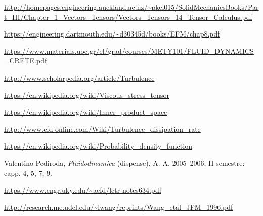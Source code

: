 \documentclass[12pt,a4paper]{article}
\numberwithin{equation}{subsection}
\begin{document}
\begin{thebibliography}{1}
  \url{http://homepages.engineering.auckland.ac.nz/~pkel015/SolidMechanicsBooks/Part_III/Chapter_1_Vectors_Tensors/Vectors_Tensors_14_Tensor_Calculus.pdf}

  \url{https://engineering.dartmouth.edu/~d30345d/books/EFM/chap8.pdf}

  \url{https://www.materials.uoc.gr/el/grad/courses/METY101/FLUID_DYNAMICS_CRETE.pdf}     

  \url{http://www.scholarpedia.org/article/Turbulence}
  
  \url{https://en.wikipedia.org/wiki/Viscous_stress_tensor}

  \url{https://en.wikipedia.org/wiki/Inner_product_space}
  
  \url{http://www.cfd-online.com/Wiki/Turbulence_dissipation_rate}  
  
  \url{https://en.wikipedia.org/wiki/Probability_density_function}
  
  Valentino Pediroda, 
  \emph{Fluidodinamica} (dispense), A. A. 2005--2006, II semestre: capp. 4, 5, 7, 9.
  
  \url{https://www.engr.uky.edu/~acfd/lctr-notes634.pdf}  
  
  \url{http://research.me.udel.edu/~lwang/reprints/Wang_etal_JFM_1996.pdf}
  

\end{thebibliography}
\end{document}
